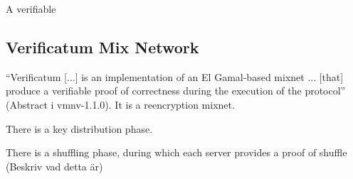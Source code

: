 A verifiable 

\subsection{Verificatum Mix Network}

``Verificatum [...] is an implementation of an El Gamal-based mixnet
... [that] produce a verifiable proof of correctness during the
execution of the protocol'' (Abstract i vmnv-1.1.0). It is a
reencryption mixnet.

There is a key distribution phase.

There is a shuffling phase, during which each server provides a proof
of shuffle (Beskriv vad detta är)



